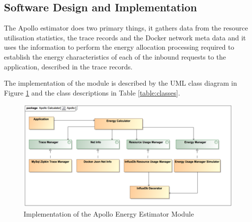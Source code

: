 \subsection{Software Design and Implementation}

The Apollo estimator does two primary things, it gathers data from the resource utilisation statistics, the trace records and the Docker network meta data and it uses the information to perform the energy allocation processing required to establish the energy characteristics of each of the inbound requests to the application, described in the trace records. 

The implementation of the module is described by the UML class diagram in Figure \ref{figure:classes} and the class descriptions in Table \ref{table:classes}.

\begin{figure}
\centering
\includegraphics[width=1.0\textwidth]{Figures/implementation-classes}
\caption{Implementation of the Apollo Energy Estimator Module}
\label{figure:classes}
\end{figure}

